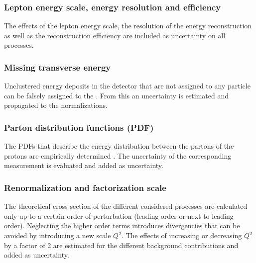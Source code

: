 \subsubsection*{Lepton energy scale, energy resolution and efficiency}
The effects of the lepton energy scale, the resolution of the energy reconstruction as well as the reconstruction efficiency are included as uncertainty on all processes.
\subsubsection*{Missing transverse energy}
Unclustered energy deposits in the detector that are not assigned to any particle can be falsely assigned to the \MET . From this an uncertainty is estimated and propagated to the normalizations. 
\subsubsection*{Parton distribution functions (PDF)}
The PDFs that describe the energy distribution between the partons of the protons are empirically determined \cite{pdf4lhc}. The uncertainty of the corresponding measurement is evaluated and added as uncertainty.
\subsubsection*{Renormalization and factorization scale}
The theoretical cross section of the different considered processes are calculated only up to a certain order of perturbation (leading order or next-to-leading order). Neglecting the higher order terms introduces divergencies that can be avoided by introducing a new scale $Q^2$. The effects of increasing or decreasing $Q^2$ by a factor of 2 are estimated for the different background contributions and added as uncertainty. 

